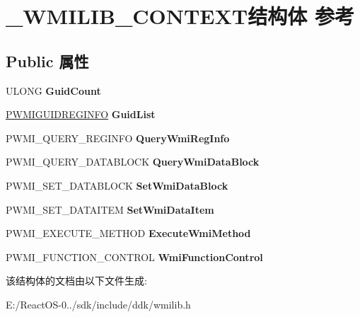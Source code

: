 \hypertarget{struct___w_m_i_l_i_b___c_o_n_t_e_x_t}{}\section{\+\_\+\+W\+M\+I\+L\+I\+B\+\_\+\+C\+O\+N\+T\+E\+X\+T结构体 参考}
\label{struct___w_m_i_l_i_b___c_o_n_t_e_x_t}
\subsection*{Public 属性}
\begin{DoxyCompactItemize}
\item 
\mbox{\label{struct___w_m_i_l_i_b___c_o_n_t_e_x_t_aa16f8beae75323e23103db090ff2652a}} 
U\+L\+O\+NG {\bfseries Guid\+Count}
\item 
\mbox{\label{struct___w_m_i_l_i_b___c_o_n_t_e_x_t_a44ab06773cc9a03efee269a0c9e7a9f4}} 
\hyperlink{struct___w_m_i_g_u_i_d_r_e_g_i_n_f_o}{P\+W\+M\+I\+G\+U\+I\+D\+R\+E\+G\+I\+N\+FO} {\bfseries Guid\+List}
\item 
\mbox{\label{struct___w_m_i_l_i_b___c_o_n_t_e_x_t_a757f14306bb0dfb3e33cc976da69b7c0}} 
P\+W\+M\+I\+\_\+\+Q\+U\+E\+R\+Y\+\_\+\+R\+E\+G\+I\+N\+FO {\bfseries Query\+Wmi\+Reg\+Info}
\item 
\mbox{\label{struct___w_m_i_l_i_b___c_o_n_t_e_x_t_a3b49bb23d7b98cc6fffb840c90cd57fe}} 
P\+W\+M\+I\+\_\+\+Q\+U\+E\+R\+Y\+\_\+\+D\+A\+T\+A\+B\+L\+O\+CK {\bfseries Query\+Wmi\+Data\+Block}
\item 
\mbox{\label{struct___w_m_i_l_i_b___c_o_n_t_e_x_t_a567b5f9e145749b466e83422fbac93e9}} 
P\+W\+M\+I\+\_\+\+S\+E\+T\+\_\+\+D\+A\+T\+A\+B\+L\+O\+CK {\bfseries Set\+Wmi\+Data\+Block}
\item 
\mbox{\label{struct___w_m_i_l_i_b___c_o_n_t_e_x_t_a219b62f36a020188ab91c53819d1b396}} 
P\+W\+M\+I\+\_\+\+S\+E\+T\+\_\+\+D\+A\+T\+A\+I\+T\+EM {\bfseries Set\+Wmi\+Data\+Item}
\item 
\mbox{\label{struct___w_m_i_l_i_b___c_o_n_t_e_x_t_a2d7ce6249b2dcfe11ad149da6982c5f8}} 
P\+W\+M\+I\+\_\+\+E\+X\+E\+C\+U\+T\+E\+\_\+\+M\+E\+T\+H\+OD {\bfseries Execute\+Wmi\+Method}
\item 
\mbox{\label{struct___w_m_i_l_i_b___c_o_n_t_e_x_t_af5e87abe2625ab993865054672ce9cc2}} 
P\+W\+M\+I\+\_\+\+F\+U\+N\+C\+T\+I\+O\+N\+\_\+\+C\+O\+N\+T\+R\+OL {\bfseries Wmi\+Function\+Control}
\end{DoxyCompactItemize}


该结构体的文档由以下文件生成\+:\begin{DoxyCompactItemize}
\item 
E\+:/\+React\+O\+S-\/0../sdk/include/ddk/wmilib.\+h\end{DoxyCompactItemize}
